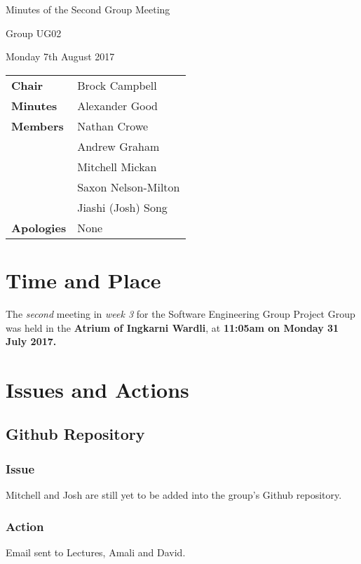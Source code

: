 \documentclass{article}
\begin{document}
\begin{center}    
{\huge Minutes of the Second Group Meeting \par}
\vspace{0.5cm}
{\large Group UG02 \par}
\vspace{0.5cm}
{\large Monday 7th August 2017 \par}
\vspace{0.5cm}
\end{center}

\begin{flushleft}
\begin{tabular}{ll}
{\bfseries Chair} & Brock Campbell \\
{\bfseries Minutes} & Alexander Good \\
{\bfseries Members} & Nathan Crowe \\
 & Andrew Graham \\
 & Mitchell Mickan \\
 & Saxon Nelson-Milton \\
 & Jiashi (Josh) Song \\
{\bfseries Apologies} & None\\
\end{tabular}
\end{flushleft}

\section{Time and Place}
The {\itshape second} meeting in {\itshape week 3} for the Software Engineering Group Project Group was held in the {\bfseries Atrium of Ingkarni Wardli}, at {\bfseries 11:05am on Monday 31 July 2017.} 

\section{Issues and Actions}
	\subsection{Github Repository}
		\subsubsection*{Issue}
		Mitchell and Josh are still yet to be added into the group's Github repository. 
    	\subsubsection*{Action}
    	Email sent to Lectures, Amali and David.
\end{document}
